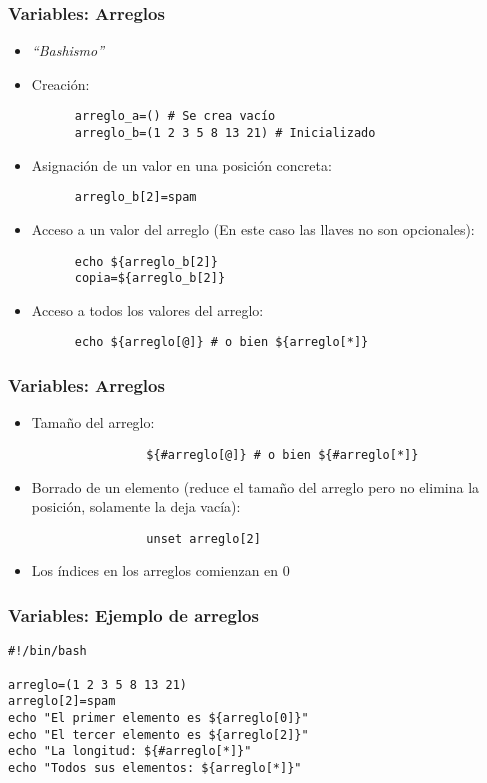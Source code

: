 \begin{frame}[fragile]
  \frametitle{Variables: Arreglos}
  \begin{itemize}
  \item \alert{\textit{``Bashismo''}}
  \item Creación:
    \begin{lstlisting}
      arreglo_a=() # Se crea vacío
      arreglo_b=(1 2 3 5 8 13 21) # Inicializado
    \end{lstlisting}
  \item Asignación de un valor en una posición concreta:
    \begin{lstlisting}
      arreglo_b[2]=spam
    \end{lstlisting}
  \item Acceso a un valor del arreglo (En este caso las llaves no son opcionales):
    \begin{lstlisting}
      echo ${arreglo_b[2]}
      copia=${arreglo_b[2]}
    \end{lstlisting}
  \item Acceso a todos los valores del arreglo:
    \begin{lstlisting}
      echo ${arreglo[@]} # o bien ${arreglo[*]}
    \end{lstlisting}
  \end{itemize}
\end{frame}
\begin{frame}[fragile]
	\frametitle{Variables: Arreglos}
	\begin{itemize}
		\item Tamaño del arreglo:
			\begin{lstlisting}
				${#arreglo[@]} # o bien ${#arreglo[*]}
			\end{lstlisting}
		\item Borrado de un elemento (reduce el tamaño del arreglo pero no elimina la posición, solamente la deja vacía):
			\begin{lstlisting}
				unset arreglo[2]
			\end{lstlisting}
		\item Los índices en los arreglos comienzan en 0
	\end{itemize}
\end{frame}
\begin{frame}[fragile]
	\frametitle{Variables: Ejemplo de arreglos}
	\begin{lstlisting}
#!/bin/bash

arreglo=(1 2 3 5 8 13 21)‏
arreglo[2]=spam
echo "El primer elemento es ${arreglo[0]}"
echo "El tercer elemento es ${arreglo[2]}"
echo "La longitud: ${#arreglo[*]}"
echo "Todos sus elementos: ${arreglo[*]}"
\end{lstlisting}
\end{frame}


